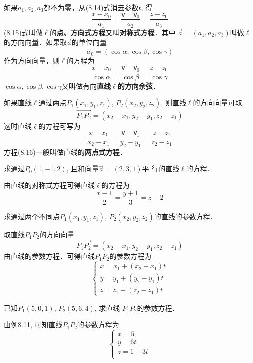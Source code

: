 如果$a_1,a_2,a_3$都不为零，从(8.14)式消去参数$t$, 得
\begin{equation}
    \frac{x-x_0}{a_1}=\frac{y-y_0}{a_2}=\frac{z-z_0}{a_3}
\end{equation}
(8.15)式叫做$\ell$的\textbf{点、方向式方程}又叫\textbf{对称式方程}．其中
$\vec{a}=(a_1,a_2,a_3)$叫做$\ell$的方向向量．如果取$\vec{a}$的单位向量
\[\vec{a}_0=(\cos\alpha, \cos\beta,\cos\gamma)\]
作为方向向量，则$\ell$的方程为
\[\frac{x-x_0}{\cos\alpha}=\frac{y-y_0}{\cos\beta}=\frac{z-z_0}{\cos\gamma}\]
$\cos\alpha, \cos\beta,\cos\gamma$又叫做有向\textbf{直线$\ell$的方向余弦}．

如果直线$\ell$通过两点$P_1(x_1,y_1,z_1)$, $P_2(x_2,y_2,z_2)$, 
则直线$\ell$的方向向量可取
\[\Vec{P_1P_2}=(x_2-x_1,y_2-y_1,z_2-z_1)\]
这时直线$\ell$的方程可写为
\begin{equation}
    \frac{x-x_1}{x_2-x_1}=\frac{y-y_1}{y_2-y_1}=\frac{z-z_1}{z_2-z_1}
\end{equation}
方程(8.16)一般叫做直线的\textbf{两点式方程}．



\begin{example}
    求通过$P_0(1,-1,2)$, 且和向量$\vec{a}=(2,3,1)$平
行的直线$\ell$的方程．
\end{example}


\begin{solution}
    由直线的对称式方程可得直线$\ell$的方程为
\[\frac{x-1}{2}=\frac{y+1}{3}=z-2\]
\end{solution}

\begin{example}
    求通过两个不同点$P_1(x_1,y_1,z_1)$, $P_2(x_2,
y_2,z_2)$的直线的参数方程．
\end{example}


\begin{solution}
    取直线$P_1P_2$的方向向量
\[    \Vec{P_1P_2}=(x_2-x_1, y_2-y_1,z_2-z_1)\]
    由直线的参数方程．可得直线$P_1P_2$的参数方程为
\[\begin{cases}
    x=x_1+(x_2-x_1)t\\
    y=y_1+(y_2-y_1)t\\
    z=z_1+(z_2-z_1)t
\end{cases}\]
\end{solution}    

\begin{example}
    已知$P_1(5,0,1)$, $P_2(5,6,4)$, 求直线
$P_1P_2$的参数方程．
\end{example}


\begin{solution}
    由例8.11, 可知直线$P_1P_2$的参数方程为
    \[\begin{cases}
     x=5\\
y=6t\\
z=1+3t\\
    \end{cases}\]
\end{solution}

